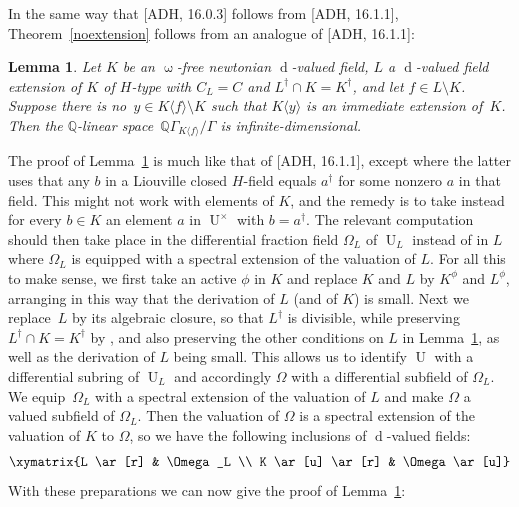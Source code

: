\documentclass[]{amsart}
\numberwithin{equation}{section}
\newcommand{\bbold}{\mathbb}
\def\Q { {\bbold Q} }
\def \Univ {{\operatorname{U}}}
\def \d{\operatorname{d}}
\newtheorem{lemma}[theorem]{Lemma}
\theoremstyle{definition}
\theoremstyle{remark}
\def \upo{\upomega}
\begin{document}
\noindent
In the same way that [ADH,   16.0.3] follows from [ADH,   16.1.1], Theorem~\ref{noextension} follows from an  analogue of [ADH, 16.1.1]:

\begin{lemma}\label{lem:ADH 16.1.1, Calinfi}
Let $K$ be an $\upo$-free newtonian $\d$-valued field, $L$ a $\d$-valued field extension of $K$ of $H$-type with
$C_L=C$ and $L^\dagger\cap K=K^\dagger$, and let $f\in L\setminus K$. Suppose there is no~$y\in K\langle f\rangle\setminus K$ such that $K\langle y\rangle$ is an immediate extension of~$K$.
Then the $\Q$-linear space~$\Q\Gamma_{K\langle f\rangle}/\Gamma$ is infinite-dimensional.
\end{lemma} 

\noindent
The proof of Lemma~\ref{lem:ADH 16.1.1, Calinfi} is much like that of [ADH,   16.1.1], except where
the latter uses that any $b$ in a Liouville closed $H$-field equals $a^\dagger$ for some nonzero $a$ in that field. This might not work with elements of $K$, and the remedy is to take instead for every $b\in K$ an element $a$ in $\Univ^\times$ with $b=a^\dagger$.
The relevant computation should then take place in the differential fraction field $\Omega_L$ of $\Univ_L$ instead of in $L$ where $\Omega_L$ is equipped with a spectral extension of the valuation of $L$. For all this  to make sense, we first take an active $\phi$ in $K$ and
replace $K$ and $L$ by $K^\phi$ and $L^\phi$, arranging in this way that the derivation of $L$ (and of $K$) is small. Next we
replace~$L$ by its algebraic closure, so that $L^\dagger$ is divisible, while preserving $L^\dagger\cap K=K^\dagger$ by 
\cite[Lemma~1.2.1]{ADH4},  and also preserving the other conditions on $L$ in Lemma~\ref{lem:ADH 16.1.1, Calinfi}, as well as the derivation of $L$ being small.  This allows us to
identify  $\Univ$ with a differential subring of $\Univ_L$
 and accordingly $\Omega$ with a differential subfield of $\Omega_L$.  We equip~$\Omega_L$ with a spectral extension of the valuation of $L$ %
and make $\Omega$ a valued subfield of $\Omega_L$. Then the valuation of $\Omega$ is a spectral extension of the valuation of $K$ to $\Omega$, so we have
the following inclusions of $\d$-valued fields:
$$\xymatrix{L \ar[r] & \Omega_L \\
K \ar[u] \ar[r] & \Omega \ar[u]}$$
With these preparations we can now give  the proof of Lemma~\ref{lem:ADH 16.1.1, Calinfi}:
\end{document}
